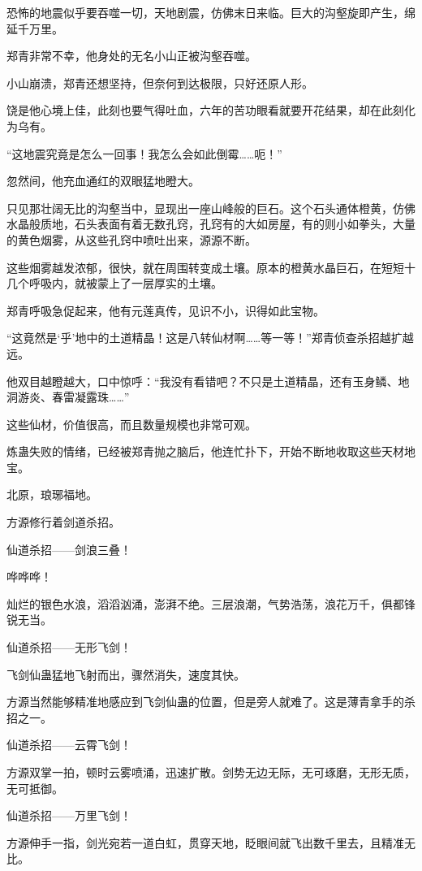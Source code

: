 \begin{this_body}
恐怖的地震似乎要吞噬一切，天地剧震，仿佛末日来临。巨大的沟壑旋即产生，绵延千万里。

郑青非常不幸，他身处的无名小山正被沟壑吞噬。

小山崩溃，郑青还想坚持，但奈何到达极限，只好还原人形。

饶是他心境上佳，此刻也要气得吐血，六年的苦功眼看就要开花结果，却在此刻化为乌有。

“这地震究竟是怎么一回事！我怎么会如此倒霉……呃！”

忽然间，他充血通红的双眼猛地瞪大。

只见那壮阔无比的沟壑当中，显现出一座山峰般的巨石。这个石头通体橙黄，仿佛水晶般质地，石头表面有着无数孔窍，孔窍有的大如房屋，有的则小如拳头，大量的黄色烟雾，从这些孔窍中喷吐出来，源源不断。

这些烟雾越发浓郁，很快，就在周围转变成土壤。原本的橙黄水晶巨石，在短短十几个呼吸内，就被蒙上了一层厚实的土壤。

郑青呼吸急促起来，他有元莲真传，见识不小，识得如此宝物。

“这竟然是‘乎’地中的土道精晶！这是八转仙材啊……等一等！”郑青侦查杀招越扩越远。

他双目越瞪越大，口中惊呼：“我没有看错吧？不只是土道精晶，还有玉身鳞、地洞游炎、春雷凝露珠……”

这些仙材，价值很高，而且数量规模也非常可观。

炼蛊失败的情绪，已经被郑青抛之脑后，他连忙扑下，开始不断地收取这些天材地宝。

北原，琅琊福地。

方源修行着剑道杀招。

仙道杀招——剑浪三叠！

哗哗哗！

灿烂的银色水浪，滔滔汹涌，澎湃不绝。三层浪潮，气势浩荡，浪花万千，俱都锋锐无当。

仙道杀招——无形飞剑！

飞剑仙蛊猛地飞射而出，骤然消失，速度其快。

方源当然能够精准地感应到飞剑仙蛊的位置，但是旁人就难了。这是薄青拿手的杀招之一。

仙道杀招——云霄飞剑！

方源双掌一拍，顿时云雾喷涌，迅速扩散。剑势无边无际，无可琢磨，无形无质，无可抵御。

仙道杀招——万里飞剑！

方源伸手一指，剑光宛若一道白虹，贯穿天地，眨眼间就飞出数千里去，且精准无比。


\end{this_body}
